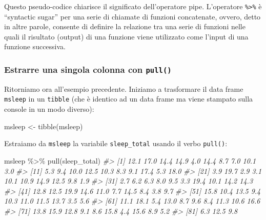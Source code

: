 \documentclass[
  11pt,
]{krantz}
\makeatletter
\newenvironment{Shaded}{\begin{snugshade}}{\end{snugshade}}
\newcommand{\CommentTok}[1]{\textcolor[rgb]{0.37,0.37,0.37}{\textit{#1}}}
\newcommand{\FunctionTok}[1]{\textcolor[rgb]{0,0,0}{#1}}
\newcommand{\NormalTok}[1]{#1}
\newcommand{\OtherTok}[1]{\textcolor[rgb]{0.37,0.37,0.37}{#1}}
\newcommand{\SpecialCharTok}[1]{\textcolor[rgb]{0,0,0}{#1}}
\newenvironment{kframe}{%
\medskip{}
\setlength{\fboxsep}{.8em}
 \def\at@end@of@kframe{}%
 \ifinner\ifhmode%
  \def\at@end@of@kframe{\end{minipage}}%
  \begin{minipage}{\columnwidth}%
 \fi\fi%
 \def\FrameCommand##1{\hskip\@totalleftmargin \hskip-\fboxsep
 \colorbox{shadecolor}{##1}\hskip-\fboxsep
     \hskip-\linewidth \hskip-\@totalleftmargin \hskip\columnwidth}%
 \MakeFramed {\advance\hsize-\width
   \@totalleftmargin\z@ \linewidth\hsize
   \@setminipage}}%
 {\par\unskip\endMakeFramed%
 \at@end@of@kframe}
\renewenvironment{Shaded}{\begin{kframe}}{\end{kframe}}
\theoremstyle{definition}
\theoremstyle{definition}
\theoremstyle{definition}
\theoremstyle{definition}
\theoremstyle{remark}
\makeatother
\begin{document}
Questo pseudo-codice chiarisce il significato dell'operatore pipe. L'operatore \texttt{\%\textgreater{}\%} è ``syntactic sugar'' per una serie di chiamate di funzioni concatenate, ovvero, detto in altre parole, consente di definire la relazione tra una serie di funzioni nelle quali il risultato (output) di una funzione viene utilizzato come l'input di una funzione successiva.

\hypertarget{estrarre-una-singola-colonna-con-pull}{%
\subsubsection{\texorpdfstring{Estrarre una singola colonna con \texttt{pull()}}{Estrarre una singola colonna con pull()}}\label{estrarre-una-singola-colonna-con-pull}}

Ritorniamo ora all'esempio precedente. Iniziamo a trasformare il data frame \texttt{msleep} in un \texttt{tibble} (che è identico ad un data frame ma viene stampato sulla console in un modo diverso):

\begin{Shaded}
\begin{Highlighting}[]
\NormalTok{msleep }\OtherTok{\textless{}{-}} \FunctionTok{tibble}\NormalTok{(msleep)}
\end{Highlighting}
\end{Shaded}

\noindent  Estraiamo da \texttt{msleep} la variabile \texttt{sleep\_total} usando il verbo \texttt{pull()}:

\begin{Shaded}
\begin{Highlighting}[]
\NormalTok{msleep }\SpecialCharTok{\%\textgreater{}\%} 
  \FunctionTok{pull}\NormalTok{(sleep\_total)}
\CommentTok{\#\textgreater{}  [1] 12.1 17.0 14.4 14.9  4.0 14.4  8.7  7.0 10.1  3.0}
\CommentTok{\#\textgreater{} [11]  5.3  9.4 10.0 12.5 10.3  8.3  9.1 17.4  5.3 18.0}
\CommentTok{\#\textgreater{} [21]  3.9 19.7  2.9  3.1 10.1 10.9 14.9 12.5  9.8  1.9}
\CommentTok{\#\textgreater{} [31]  2.7  6.2  6.3  8.0  9.5  3.3 19.4 10.1 14.2 14.3}
\CommentTok{\#\textgreater{} [41] 12.8 12.5 19.9 14.6 11.0  7.7 14.5  8.4  3.8  9.7}
\CommentTok{\#\textgreater{} [51] 15.8 10.4 13.5  9.4 10.3 11.0 11.5 13.7  3.5  5.6}
\CommentTok{\#\textgreater{} [61] 11.1 18.1  5.4 13.0  8.7  9.6  8.4 11.3 10.6 16.6}
\CommentTok{\#\textgreater{} [71] 13.8 15.9 12.8  9.1  8.6 15.8  4.4 15.6  8.9  5.2}
\CommentTok{\#\textgreater{} [81]  6.3 12.5  9.8}
\end{Highlighting}
\end{Shaded}
\end{document}

